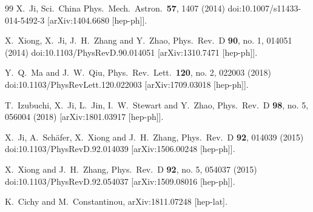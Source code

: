 \begin{thebibliography}{99}
  X.~Ji,
  Sci.\ China Phys.\ Mech.\ Astron.\  {\bf 57}, 1407 (2014)
  doi:10.1007/s11433-014-5492-3
  [arXiv:1404.6680 [hep-ph]].


  X.~Xiong, X.~Ji, J.~H.~Zhang and Y.~Zhao,
  Phys.\ Rev.\ D {\bf 90}, no. 1, 014051 (2014)
  doi:10.1103/PhysRevD.90.014051
  [arXiv:1310.7471 [hep-ph]].


  Y.~Q.~Ma and J.~W.~Qiu,
  Phys.\ Rev.\ Lett.\  {\bf 120}, no. 2, 022003 (2018)
  doi:10.1103/PhysRevLett.120.022003
  [arXiv:1709.03018 [hep-ph]].


  T.~Izubuchi, X.~Ji, L.~Jin, I.~W.~Stewart and Y.~Zhao,
  Phys.\ Rev.\ D {\bf 98}, no. 5, 056004 (2018)
  [arXiv:1801.03917 [hep-ph]].


  X.~Ji, A.~Schäfer, X.~Xiong and J.~H.~Zhang,
  Phys.\ Rev.\ D {\bf 92}, 014039 (2015)
  doi:10.1103/PhysRevD.92.014039
  [arXiv:1506.00248 [hep-ph]].


  X.~Xiong and J.~H.~Zhang,
  Phys.\ Rev.\ D {\bf 92}, no. 5, 054037 (2015)
  doi:10.1103/PhysRevD.92.054037
  [arXiv:1509.08016 [hep-ph]].

  K.~Cichy and M.~Constantinou,
  arXiv:1811.07248 [hep-lat].



\end{thebibliography}
